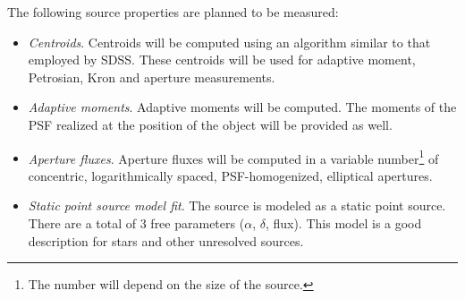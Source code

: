 \documentclass[12pt]{article}
\begin{document}
The following source properties are planned to be measured:
%
\begin{itemize}
       \item {\em Centroids}. Centroids will be computed using an algorithm similar to that employed by SDSS. These centroids will be used for adaptive moment, Petrosian, Kron and aperture measurements.

    \item {\em Adaptive moments}. Adaptive moments will be computed. The moments of the PSF realized at the position of the object will be provided as well.
    

       \item {\em Aperture fluxes}. Aperture fluxes will be computed in a variable number\footnote{The number will depend on the size of the source.} of concentric, logarithmically spaced, PSF-homogenized, elliptical apertures.

    \item {\em Static point source model fit}. The source is modeled as a static point source. There are a total of 3 free parameters ($\alpha$, $\delta$, flux). This model is a good description for stars and other unresolved sources.


\end{itemize}
\end{document}
